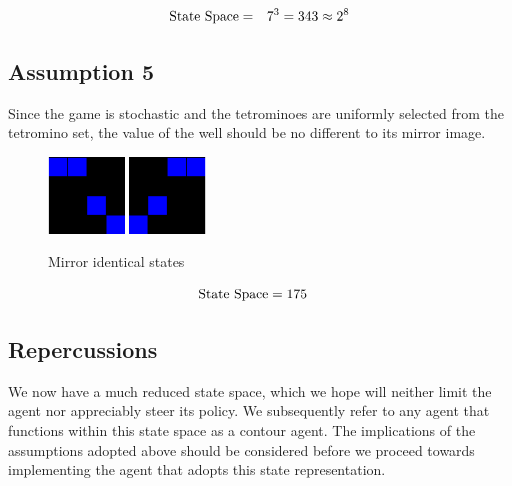 \documentclass{rucsthesis}
\begin{document}
\begin{eqnarray*}
\centering
\textrm{State Space} & = & 7^{3} = 343 \approx 2^{8}
\end{eqnarray*}

\subsection*{Assumption 5}

Since the game is stochastic and the tetrominoes are uniformly selected from the tetromino set, the value of the well should be no different to its mirror image.

\begin{figure}[h]
\centering
\includegraphics[width=0.8in]{reducedwell.png}
\includegraphics[width=0.8in]{mirrorwell.png}
\caption{Mirror identical states}
\label{fig:mirrorwell}
\end{figure}

\begin{eqnarray*}
\centering
\textrm{State Space} & = 175
\end{eqnarray*}

\subsection*{Repercussions}

We now have a much reduced state space, which we hope will neither limit the agent nor appreciably steer its policy. We subsequently refer to any agent that functions within this state space as a contour agent. The implications of the assumptions adopted above should be considered before we proceed towards implementing the agent that adopts this state representation.
\end{document}
